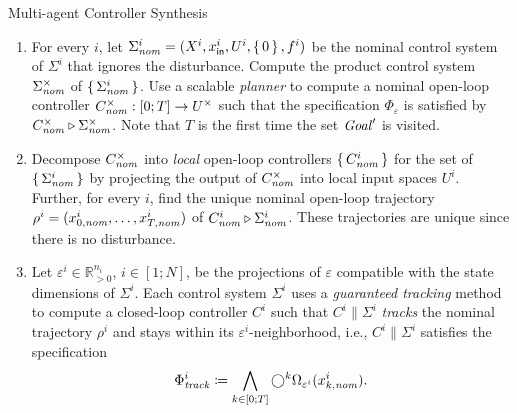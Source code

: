 \begin{algorithm}[t]
	\caption{Multi-agent Controller Synthesis}
	\label{alg:main}
	\begin{enumerate}
		\item For every $i$, let $\Sigma_{\mathit{nom}}^i = (X^i,x_{\mathsf{in}}^i,U^i,\set{0},f^i)$ be the nominal control system of $\Sigma^i$ that ignores the disturbance.
		Compute the product control system $\Sigma^\times_{\mathit{nom}}$ of $\set{\Sigma^i_{\mathit{nom}}}$. 
		Use a scalable \emph{planner} to compute a nominal open-loop controller $C^\times_{\mathit{nom}}:[0;T]\rightarrow U^\times$ such that the specification $\Phi_\varepsilon$ is satisfied by $C^\times_{\mathit{nom}}\triangleright\Sigma_{\mathit{nom}}^{\times}$.
		Note that $T$ is the first time the set $\mathit{Goal}'$ is visited. \label{step:planning}
		\item Decompose $C^\times_{\mathit{nom}}$ into \emph{local} open-loop controllers $\set{C^i_{\mathit{nom}}}$ for the set of $\set{\Sigma^i_{\mathit{nom}}}$ by projecting the output of $C^\times_{\mathit{nom}}$ into local input spaces $U^i$.
		Further, for every $i$, find the unique nominal open-loop trajectory $\rho^i=(x_{0,\mathit{nom}}^i,\ldots,x_{T,\mathit{nom}}^i)$ of $C^i_{\mathit{nom}}\triangleright \Sigma_{\mathit{nom}}^i$. These trajectories are unique since there is no disturbance. \label{step:decompose}
		\item Let $\varepsilon^i\in \mathbb{R}^{n_i}_{>0}$, $i\in[1;N]$, be the projections of $\varepsilon$ compatible with the state dimensions of $\Sigma^i$.
		Each control system $\Sigma^i$ uses a \emph{guaranteed tracking} method to compute a closed-loop controller $C^i$ such that $C^i\parallel \Sigma^i$ \emph{tracks} the nominal trajectory $\rho^i$ and stays within its $\varepsilon^i$-neighborhood, i.e., $C^i\parallel \Sigma^i$ satisfies the specification
		\begin{align}
			\label{eq:ltl_spec}
			\Phi_{\mathit{track}}^i\coloneqq \bigwedge_{k\in [0;T]} \bigcirc^k \Omega_{\varepsilon^i}(x_{k,\mathit{nom}}^i).
		\end{align}
		\label{step:tracking}
	\end{enumerate}
\end{algorithm}


